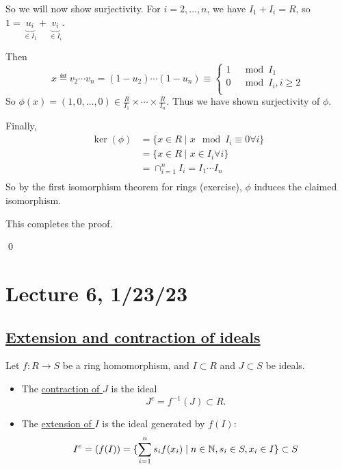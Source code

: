 \documentclass[x11names,reqno,14pt]{extarticle}
\begin{document}
\begin{enumerate}[label=(\roman*)]
So we will now show surjectivity. For $i = 2, \dots, n$, we have $I_1 + I_i = R$, so $1 = \underbrace{u_i}_{\in I_1} + \underbrace{v_i}_{\in I_i}$. 

Then 
\[
x \eqdef v_2\cdots v_n = (1 - u_2)\cdots(1 - u_n)\equiv \begin{cases}
1 & \mod I_1 \\0 & \mod I_i, i \geq 2 \\
\end{cases}
\]
So $\phi(x) = (1, 0, \dots, 0) \in \frac{R}{I_1}\times\cdots\times\frac{R}{I_n}$. Thus we have shown surjectivity of $\phi$. 

Finally,
\begin{align*}
\ker(\phi) & = \{x\in R \mid x \mod I_i \equiv 0 \forall i\} \\
			  & = \{x \in R \mid x \in I_i \forall i \} \\
			  & = \cap_{i=1}^nI_i = I_1\cdots I_n \\
\end{align*}
So by the first isomorphism theorem for rings (exercise), $\phi$ induces the claimed isomorphism.  


\end{enumerate}

This completes the proof. 

\qed

\section*{Lecture 6, 1/23/23}

\subsection*{\underline{Extension and contraction of ideals}}


Let $f:R\to S$ be a ring homomorphism, and $I\subset R$ and $J \subset S$ be ideals. 

\begin{itemize}

\item The \underline{contraction of $J$} is the ideal 
\[
J^c = f^{-1}(J)\subset R.
\]
\item The \underline{extension of $I$} is the ideal generated by $f(I)$:
\[
I^e = (f(I)) = \{\sum_{i=1}^ns_if(x_i) \mid n \in \mathbb{N}, s_i \in S, x_i \in I\} \subset S
\]

\end{itemize}
\end{document}
